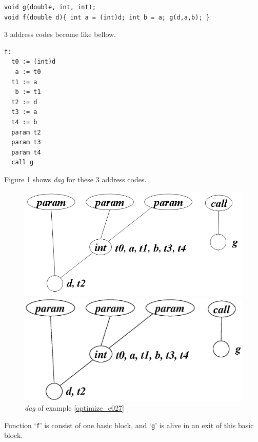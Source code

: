 \begin{Example}
\label{optimize_e027}
\begin{verbatim}
void g(double, int, int);
void f(double d){ int a = (int)d; int b = a; g(d,a,b); }
\end{verbatim}
3 address codes become like bellow.
\begin{verbatim}
f:
  t0 := (int)d
   a := t0
  t1 := a
   b := t1
  t2 := d
  t3 := a
  t4 := b
  param t2
  param t3
  param t4
  call g
\end{verbatim}
Figure \ref{optimize_e028} shows {\em dag} for these 3 address codes.
\begin{figure}[htbp]
\begin{center}
\begin{htmlonly}
\includegraphics[width=1.0\linewidth,height=0.483\linewidth]{opt012.png}
\end{htmlonly}
\begin{latexonly}
\includegraphics[width=1.0\linewidth,height=0.483\linewidth]{opt012.eps}
\end{latexonly}
\caption{{\em dag} of example \ref{optimize_e027}}
\label{optimize_e028}
\end{center}
\end{figure}
Function `{\tt{f}}' is consist of one basic block, and 
`{\tt{g}}' is alive in an exit of this basic block.

\end{Example}
